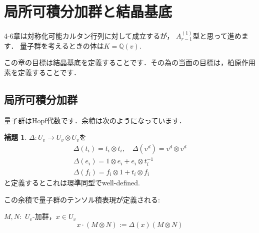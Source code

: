 \documentclass[dvipdfmx,autodetect-engine]{article}
\title{}
\author{}
\date{}
\theoremstyle{definition}
\newtheorem{Lem}{補題}
\begin{document}
\section{局所可積分加群と結晶基底}
    4-6章は対称化可能カルタン行列に対して成立するが， $A^{(1)}_{r-1}$型と思って進めます．
    量子群を考えるときの体は$K = \mathbb{Q}(v)$.
    
    この章の目標は結晶基底を定義することです．その為の当面の目標は，柏原作用素を定義することです．
    
\subsection{局所可積分加群}
    量子群はHopf代数です．余積は次のようになっています．
    \begin{Lem}
        $\Delta:U_{v} \to U_{v} \otimes U_{v}$を
        \[
            \begin{array}{c}
                {\Delta\left(t_{i}\right)=t_{i} \otimes t_{i}, \quad \Delta\left(v^{d}\right)=v^{d} \otimes v^{d}} \\ {\Delta\left(e_{i}\right)=1 \otimes e_{i}+e_{i} \otimes t_{i}^{-1}} \\ 
                {\Delta\left(f_{i}\right)=f_{i} \otimes 1+t_{i} \otimes f_{i}}
            \end{array}
        \]
        と定義するとこれは環準同型でwell-defined.
    \end{Lem}
    
    この余積で量子群のテンソル積表現が定義される: 
    
    $M, N:$ $U_{v}$-加群，$x \in U_{v}$
    \[
        x \cdot (M \otimes N) := \Delta(x)(M \otimes N)
    \]
    
\end{document}
